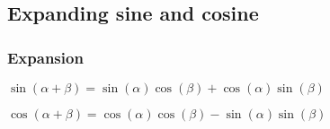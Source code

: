 
\subsection{Expanding sine and cosine}

\subsubsection{Expansion}

\(\sin (\alpha +\beta )=\sin (\alpha )\cos(\beta )+\cos(\alpha )\sin (\beta )\)

\(\cos (\alpha +\beta )=\cos (\alpha )\cos(\beta )-\sin(\alpha )\sin (\beta )\)

